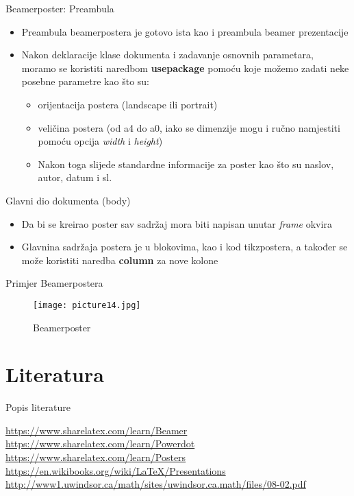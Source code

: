 \documentclass{beamer}
\begin{document}
 \begin{frame}{Beamerposter: Preambula}
 	\begin{itemize}
     	 \item Preambula beamerpostera je gotovo ista kao i preambula beamer prezentacije
     	 \item Nakon deklaracije klase dokumenta i zadavanje osnovnih parametara, moramo se koristiti naredbom \textbf{usepackage} pomoću koje možemo zadati neke posebne parametre kao što su: 
     \begin{itemize}
         \item orijentacija postera (landscape ili portrait)
         \item veličina postera (od a4 do a0, iako se dimenzije mogu i ručno namjestiti pomoću opcija \textit{width} i \textit{height})
         \item Nakon toga slijede standardne informacije za poster kao što su naslov, autor, datum i sl.
     \end{itemize}
 	\end{itemize}
 \end{frame}
 
 \begin{frame}{Glavni dio dokumenta (body)}
 	\begin{itemize}
     	\item Da bi se kreirao poster sav sadržaj mora biti napisan unutar \textit{frame} okvira
     	\item Glavnina sadržaja postera je u blokovima, kao i kod tikzpostera, a također se može koristiti naredba \textbf{column} za nove kolone
 	\end{itemize}     
 \end{frame}

 \begin{frame}{Primjer Beamerpostera}
      \begin{figure}
 			\texttt{[image: picture14.jpg]}
 			\caption{Beamerposter}
 	  \end{figure} 
\end{frame}

\section{Literatura}

\begin{frame}{Popis literature}	

\begin{thebibliography}{9}
\beamertemplatetextbibitems
{} \url{https://www.sharelatex.com/learn/Beamer}
 	\url{https://www.sharelatex.com/learn/Powerdot}
 \url{https://www.sharelatex.com/learn/Posters}
 \url{https://en.wikibooks.org/wiki/LaTeX/Presentations}
 \url{http://www1.uwindsor.ca/math/sites/uwindsor.ca.math/files/08-02.pdf}
\end{thebibliography}
\end{frame}

  
\end{document}
